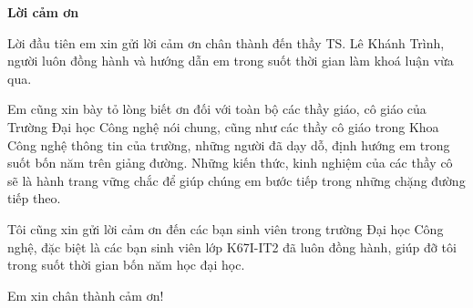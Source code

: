 \begin{center}
\textbf{\large{Lời cảm ơn}	}
\end{center}

Lời đầu tiên em xin gửi lời cảm ơn chân thành đến thầy TS. Lê Khánh Trình, người luôn đồng hành và hướng dẫn em trong suốt thời gian làm khoá luận vừa qua.

Em cũng xin bày tỏ lòng biết ơn đối với toàn bộ các thầy giáo, cô giáo của Trường Đại học Công nghệ nói chung, cũng như các thầy cô giáo trong Khoa Công nghệ thông tin của trường, những người đã dạy dỗ, định hướng em trong suốt bốn năm trên giảng đường. Những kiến thức, kinh nghiệm của các thầy cô sẽ là hành trang vững chắc để giúp chúng em bước tiếp trong những chặng đường tiếp theo.

Tôi cũng xin gửi lời cảm ơn đến các bạn sinh viên trong trường Đại học Công nghệ, 
đặc biệt là các bạn sinh viên lớp K67I-IT2 đã luôn đồng hành, giúp đỡ tôi trong suốt thời gian bốn năm học đại học.

Em xin chân thành cảm ơn!
